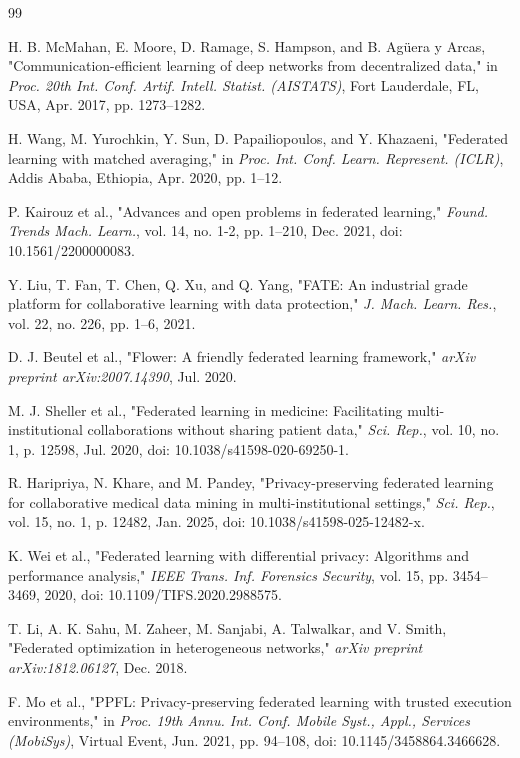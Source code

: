 \begin{thebibliography}{99}

 H. B. McMahan, E. Moore, D. Ramage, S. Hampson, and B. Agüera y Arcas, "Communication-efficient learning of deep networks from decentralized data," in \textit{Proc. 20th Int. Conf. Artif. Intell. Statist. (AISTATS)}, Fort Lauderdale, FL, USA, Apr. 2017, pp. 1273–1282.

 H. Wang, M. Yurochkin, Y. Sun, D. Papailiopoulos, and Y. Khazaeni, "Federated learning with matched averaging," in \textit{Proc. Int. Conf. Learn. Represent. (ICLR)}, Addis Ababa, Ethiopia, Apr. 2020, pp. 1–12.

 P. Kairouz et al., "Advances and open problems in federated learning," \textit{Found. Trends Mach. Learn.}, vol. 14, no. 1-2, pp. 1–210, Dec. 2021, doi: 10.1561/2200000083.

 Y. Liu, T. Fan, T. Chen, Q. Xu, and Q. Yang, "FATE: An industrial grade platform for collaborative learning with data protection," \textit{J. Mach. Learn. Res.}, vol. 22, no. 226, pp. 1–6, 2021.

 D. J. Beutel et al., "Flower: A friendly federated learning framework," \textit{arXiv preprint arXiv:2007.14390}, Jul. 2020.

 M. J. Sheller et al., "Federated learning in medicine: Facilitating multi-institutional collaborations without sharing patient data," \textit{Sci. Rep.}, vol. 10, no. 1, p. 12598, Jul. 2020, doi: 10.1038/s41598-020-69250-1.

 R. Haripriya, N. Khare, and M. Pandey, "Privacy-preserving federated learning for collaborative medical data mining in multi-institutional settings," \textit{Sci. Rep.}, vol. 15, no. 1, p. 12482, Jan. 2025, doi: 10.1038/s41598-025-12482-x.

 K. Wei et al., "Federated learning with differential privacy: Algorithms and performance analysis," \textit{IEEE Trans. Inf. Forensics Security}, vol. 15, pp. 3454–3469, 2020, doi: 10.1109/TIFS.2020.2988575.

 T. Li, A. K. Sahu, M. Zaheer, M. Sanjabi, A. Talwalkar, and V. Smith, "Federated optimization in heterogeneous networks," \textit{arXiv preprint arXiv:1812.06127}, Dec. 2018.

 F. Mo et al., "PPFL: Privacy-preserving federated learning with trusted execution environments," in \textit{Proc. 19th Annu. Int. Conf. Mobile Syst., Appl., Services (MobiSys)}, Virtual Event, Jun. 2021, pp. 94–108, doi: 10.1145/3458864.3466628.


\end{thebibliography}
